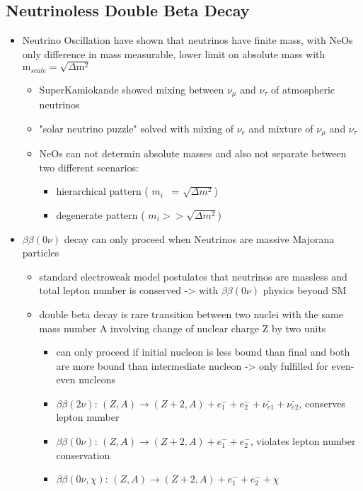 \subsection{Neutrinoless Double Beta Decay}
\label{sec:NDBD}
\begin{itemize}
\item Neutrino Oscillation have shown that neutrinos have finite mass, with NeOs only difference in mass measurable, lower limit on absolute mass with \(\mathrm{m}_{scale} = \sqrt{\Delta \mathrm{m}^2}\)
\begin{itemize}
\item SuperKamiokande showed mixing between \(\nu_\mu\) and \(\nu_\tau\) of atmospheric neutrinos
\item "solar neutrino puzzle" solved with mixing of \(\nu_e\) and mixture of \(\nu_\mu\) and \(\nu_\tau\)
\item NeOs can not determin absolute masses and also not separate between two different scenarios:
\begin{itemize}
\item hierarchical pattern ( \(m_i\)  ~= \(\sqrt{\Delta m^2}\))
\item degenerate pattern ( \(m_i >> \sqrt{\Delta m^2}\))
\end{itemize}
\end{itemize}
\item \(\beta\beta(0\nu)\) decay can only proceed when Neutrinos are massive Majorana particles
\begin{itemize}
\item standard electroweak model postulates that neutrinos are massless and total lepton number is conserved -> with \(\beta\beta(0\nu)\) physics beyond SM
\item double beta decay is rare transition between two nuclei with the same mass number A involving change of nuclear charge Z by two units
\begin{itemize}
\item can only proceed if initial nucleon is less bound than final and both are more bound than intermediate nucleon -> only fulfilled for even-even nucleons
\item \(\beta\beta(2\nu)\): \( (Z,A) \rightarrow (Z + 2, A) + e^-_1 + e^-_2 + \bar{\nu_{e1}} + \bar{\nu_{e2}} \), conserves lepton number
\item \(\beta\beta(0\nu)\): \( (Z,A) \rightarrow (Z + 2, A) + e^-_1 + e^-_2\), violates lepton number conservation
\item \(\beta\beta(0\nu, \chi)\): \((Z,A) \rightarrow (Z + 2, A) + e^-_1 + e^-_2 + \chi \)

\end{itemize}
\end{itemize}
\end{itemize}
